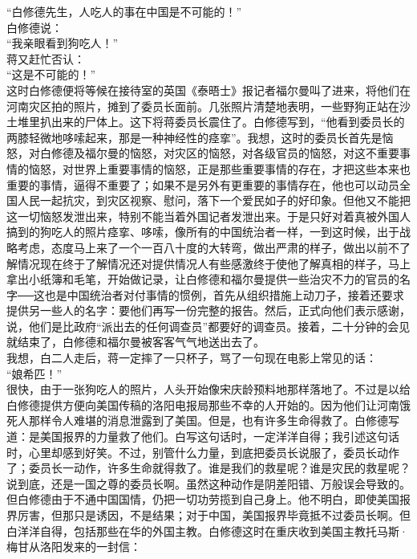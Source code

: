 “白修德先生，人吃人的事在中国是不可能的！”\\

白修德说：\\

“我亲眼看到狗吃人！”\\

蒋又赶忙否认：\\

“这是不可能的！”\\

这时白修德便将等候在接待室的英国《泰晤士》报记者福尔曼叫了进来，将他们在河南灾区拍的照片，摊到了委员长面前。几张照片清楚地表明，一些野狗正站在沙土堆里扒出来的尸体上。这下将蒋委员长震住了。白修德写到，“他看到委员长的两膝轻微地哆嗦起来，那是一种神经性的痉挛”。我想，这时的委员长首先是恼怒，对白修德及福尔曼的恼怒，对灾区的恼怒，对各级官员的恼怒，对这不重要事情的恼怒，对世界上重要事情的恼怒，正是那些重要事情的存在，才把这些本来也重要的事情，逼得不重要了；如果不是另外有更重要的事情存在，他也可以动员全国人民一起抗灾，到灾区视察、慰问，落下一个爱民如子的好印象。但他又不能把这一切恼怒发泄出来，特别不能当着外国记者发泄出来。于是只好对着真被外国人搞到的狗吃人的照片痉挛、哆嗦，像所有的中国统治者一样，一到这时候，出于战略考虑，态度马上来了一个一百八十度的大转弯，做出严肃的样子，做出以前不了解情况现在终于了解情况还对提供情况人有些感激终于使他了解真相的样子，马上拿出小纸簿和毛笔，开始做记录，让白修德和福尔曼提供一些治灾不力的官员的名字{\Add ──}这也是中国统治者对付事情的惯例，首先从组织措施上动刀子，接着还要求提供另一些人的名字：要他们再写一份完整的报告。然后，正式向他们表示感谢，说，他们是比政府“派出去的任何调查员”都要好的调查员。接着，二十分钟的会见就结束了，白修德和福尔曼被客客气气地送出去了。\\

我想，白二人走后，蒋一定摔了一只杯子，骂了一句现在电影上常见的话：\\

“娘希匹！”\\

很快，由于一张狗吃人的照片，人头开始像宋庆龄预料地那样落地了。不过是以给白修德提供方便向美国传稿的洛阳电报局那些不幸的人开始的。因为他们让河南饿死人那样令人难堪的消息泄露到了美国。但是，也有许多生命得救了。白修德写道：是美国报界的力量救了他们。白写这句话时，一定洋洋自得；我引述这句话时，心里却感到好笑。不过，别管什么力量，到底把委员长说服了，委员长动作了；委员长一动作，许多生命就得救了。谁是我们的救星呢？谁是灾民的救星呢？说到底，还是一国之尊的委员长啊。虽然这种动作是阴差阳错、万般误会导致的。但白修德由于不通中国国情，仍把一切功劳揽到自己身上。他不明白，即使美国报界厉害，但那只是诱因，不是结果；对于中国，美国报界毕竟抵不过委员长啊。但白洋洋自得，包括那些在华的外国主教。白修德这时在重庆收到美国主教托马斯·梅甘从洛阳发来的一封信：\\

